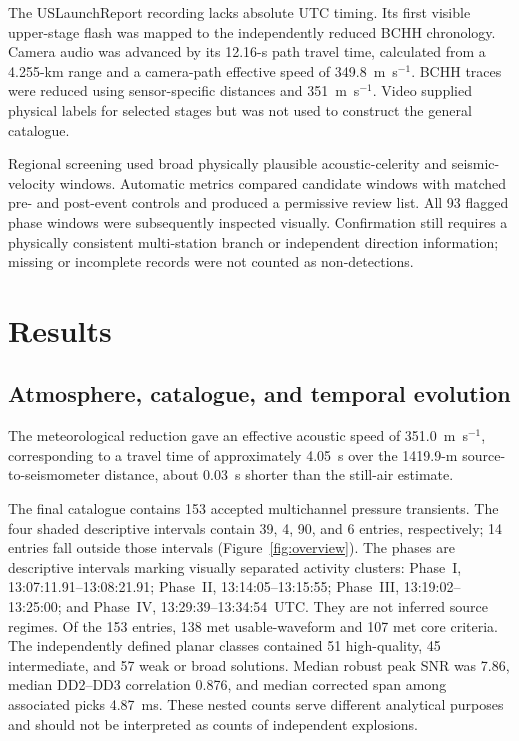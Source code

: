 \documentclass[]{seismica}
\begin{document}
The USLaunchReport recording lacks absolute UTC timing. Its first visible upper-stage
flash was mapped to the independently reduced BCHH chronology. Camera audio
was advanced by its 12.16-s path travel time, calculated from a 4.255-km range
and a camera-path effective speed of 349.8~m~s$^{-1}$. BCHH traces were reduced
using sensor-specific distances and 351~m~s$^{-1}$. Video supplied physical
labels for selected stages but was not used to construct the general catalogue.

Regional screening used broad physically plausible acoustic-celerity and
seismic-velocity windows. Automatic metrics compared candidate windows with matched pre- and post-event
controls and produced a permissive review list. All 93 flagged phase windows
were subsequently inspected visually. Confirmation still requires a physically
consistent multi-station branch or independent direction information; missing
or incomplete records were not counted as non-detections.

\section{Results}
\label{sec:results}

\subsection{Atmosphere, catalogue, and temporal evolution}
\label{sec:temporal_evolution}

The meteorological reduction gave an effective acoustic speed of
351.0~m~s$^{-1}$, corresponding to a travel time of approximately 4.05~s over
the 1419.9-m source-to-seismometer distance, about 0.03~s shorter than the
still-air estimate.

The final catalogue contains 153 accepted multichannel pressure transients.
The four shaded descriptive intervals contain 39, 4, 90, and 6 entries,
respectively; 14 entries fall outside those intervals
(Figure~\ref{fig:overview}). The phases are descriptive intervals marking
visually separated activity clusters: Phase~I, 13:07:11.91--13:08:21.91;
Phase~II, 13:14:05--13:15:55; Phase~III, 13:19:02--13:25:00; and Phase~IV,
13:29:39--13:34:54~UTC. They are not inferred source regimes. Of the 153
entries, 138 met usable-waveform and 107 met core
criteria. The independently defined planar classes contained 51 high-quality,
45 intermediate, and 57 weak or broad solutions. Median robust peak SNR was
7.86, median DD2--DD3 correlation 0.876, and median corrected span among
associated picks 4.87~ms. These nested counts serve different analytical
purposes and should not be interpreted as counts of independent explosions.
\end{document}

